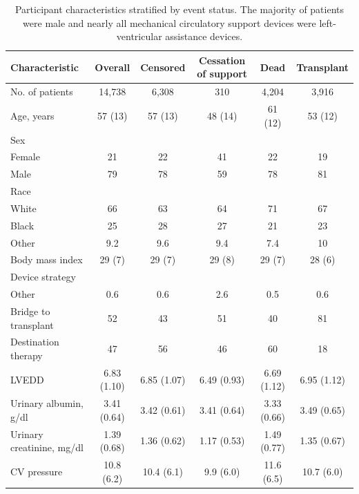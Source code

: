 \documentclass{article}
\begin{document}
\clearpage
\begin{table}
\caption{Participant characteristics stratified by event status. The majority of patients were male and nearly all mechanical circulatory support devices were left-ventricular assistance devices.}
\label{tbl_characteristics}


\begin{tabular}{lccccc}
\toprule
Characteristic & Overall & Censored & Cessation of support & Dead & Transplant\\
\midrule
No. of patients & 14,738 & 6,308 & 310 & 4,204 & 3,916\\
Age, years & 57 (13) & 57 (13) & 48 (14) & 61 (12) & 53 (12)\\
Sex &  &  &  &  & \\
\hspace{1em}Female & 21 & 22 & 41 & 22 & 19\\
\hspace{1em}Male & 79 & 78 & 59 & 78 & 81\\
\addlinespace
Race &  &  &  &  & \\
\hspace{1em}White & 66 & 63 & 64 & 71 & 67\\
\hspace{1em}Black & 25 & 28 & 27 & 21 & 23\\
\hspace{1em}Other & 9.2 & 9.6 & 9.4 & 7.4 & 10\\
Body mass index & 29 (7) & 29 (7) & 29 (8) & 29 (7) & 28 (6)\\
\addlinespace
Device strategy &  &  &  &  & \\
\hspace{1em}Other & 0.6 & 0.6 & 2.6 & 0.5 & 0.6\\
\hspace{1em}Bridge to transplant & 52 & 43 & 51 & 40 & 81\\
\hspace{1em}Destination therapy & 47 & 56 & 46 & 60 & 18\\
LVEDD & 6.83 (1.10) & 6.85 (1.07) & 6.49 (0.93) & 6.69 (1.12) & 6.95 (1.12)\\
\addlinespace
Urinary albumin, g/dl & 3.41 (0.64) & 3.42 (0.61) & 3.41 (0.64) & 3.33 (0.66) & 3.49 (0.65)\\
Urinary creatinine, mg/dl & 1.39 (0.68) & 1.36 (0.62) & 1.17 (0.53) & 1.49 (0.77) & 1.35 (0.67)\\
CV pressure & 10.8 (6.2) & 10.4 (6.1) & 9.9 (6.0) & 11.6 (6.5) & 10.7 (6.0)\\

\end{tabular}
\end{table}
\end{document}
